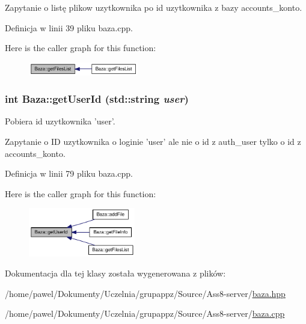 Zapytanie o listę plikow uzytkownika po id uzytkownika z bazy accounts\_\-konto. 

Definicja w linii 39 pliku baza.cpp.

Here is the caller graph for this function:\nopagebreak
\begin{figure}[H]
\begin{center}
\leavevmode
\includegraphics[width=136pt]{class_baza_02db3388d088212bd443ee39998b5cf8_icgraph}
\end{center}
\end{figure}
\hypertarget{class_baza_65054f08c8fd7c600f6c2fe2c7f61a43}{
\subsubsection[{getUserId}]{\setlength{\rightskip}{0pt plus 5cm}int Baza::getUserId (std::string {\em user})}}
\label{class_baza_65054f08c8fd7c600f6c2fe2c7f61a43}


Pobiera id uzytkownika 'user'. 

Zapytanie o ID uzytkownika o loginie 'user' ale nie o id z auth\_\-user tylko o id z accounts\_\-konto. 

Definicja w linii 79 pliku baza.cpp.

Here is the caller graph for this function:\nopagebreak
\begin{figure}[H]
\begin{center}
\leavevmode
\includegraphics[width=132pt]{class_baza_65054f08c8fd7c600f6c2fe2c7f61a43_icgraph}
\end{center}
\end{figure}


Dokumentacja dla tej klasy została wygenerowana z plików:\begin{CompactItemize}
\item 
/home/pawel/Dokumenty/Uczelnia/grupappz/Source/Ass8-server/\hyperlink{baza_8hpp}{baza.hpp}\item 
/home/pawel/Dokumenty/Uczelnia/grupappz/Source/Ass8-server/\hyperlink{baza_8cpp}{baza.cpp}\end{CompactItemize}
